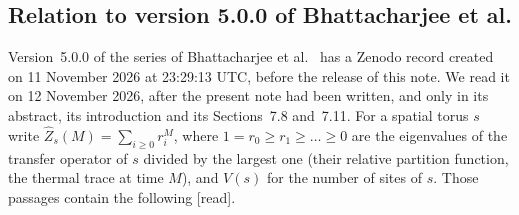 \documentclass[11pt,a4paper]{article}
\theoremstyle{plain}
\theoremstyle{definition}
\theoremstyle{remark}
\numberwithin{equation}{section}
\newcommand{\st}[1]{\textsf{[#1]}}
\begin{document}
\subsection{Relation to version 5.0.0 of Bhattacharjee et al.}\label{sec:bb26v5}
Version~5.0.0 of the series of Bhattacharjee et al.\ \cite{BB26v5} has a Zenodo record created on 11 November 2026 at 23:29:13 UTC, before
the release of this note. We read it on 12 November 2026, after the present note had been written, and only in its abstract, its
introduction and its Sections~7.8 and~7.11. For a spatial torus $s$ write $\widehat Z_s(M)=\sum_{i\ge0}r_i^M$, where $1=r_0\ge r_1\ge\dots\ge0$
are the eigenvalues of the transfer operator of $s$ divided by the largest one (their relative partition function, the thermal trace at
time $M$), and $V(s)$ for the number of sites of $s$. Those passages contain the following \st{read}.
\end{document}
